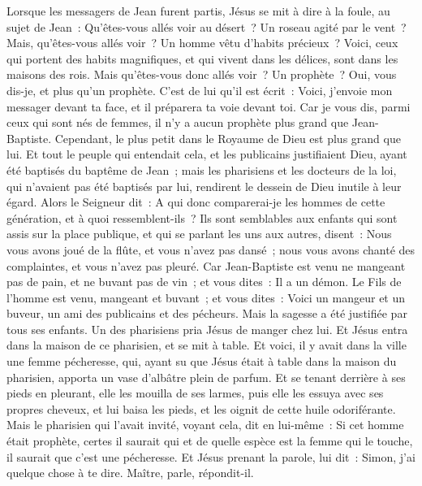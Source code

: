 \begin{multicols}{2}
Lorsque les messagers de Jean furent partis, Jésus se mit à dire à la foule, au sujet de Jean~: Qu'êtes-vous allés voir au désert~? Un roseau agité par le vent~?
Mais, qu'êtes-vous allés voir~? Un homme vêtu d'habits précieux~? Voici, ceux qui portent des habits magnifiques, et qui vivent dans les délices, sont dans les maisons des rois.
Mais qu'êtes-vous donc allés voir~? Un prophète~? Oui, vous dis-je, et plus qu'un prophète.
C'est de lui qu'il est écrit~: Voici, j'envoie mon messager devant ta face, et il préparera ta voie devant toi.
Car je vous dis, parmi ceux qui sont nés de femmes, il n'y a aucun prophète plus grand que Jean-Baptiste. Cependant, le plus petit dans le Royaume de Dieu est plus grand que lui.
Et tout le peuple qui entendait cela, et les publicains justifiaient Dieu, ayant été baptisés du baptême de Jean~;
mais les pharisiens et les docteurs de la loi, qui n'avaient pas été baptisés par lui, rendirent le dessein de Dieu inutile à leur égard.
Alors le Seigneur dit~: A qui donc comparerai-je les hommes de cette génération, et à quoi ressemblent-ils~?
Ils sont semblables aux enfants qui sont assis sur la place publique, et qui se parlant les uns aux autres, disent~: Nous vous avons joué de la flûte, et vous n'avez pas dansé~; nous vous avons chanté des complaintes, et vous n'avez pas pleuré.
Car Jean-Baptiste est venu ne mangeant pas de pain, et ne buvant pas de vin~; et vous dites~: Il a un démon.
Le Fils de l'homme est venu, mangeant et buvant~; et vous dites~: Voici un mangeur et un buveur, un ami des publicains et des pécheurs.
Mais la sagesse a été justifiée par tous ses enfants.
Un des pharisiens pria Jésus de manger chez lui. Et Jésus entra dans la maison de ce pharisien, et se mit à table.
Et voici, il y avait dans la ville une femme pécheresse, qui, ayant su que Jésus était à table dans la maison du pharisien, apporta un vase d'albâtre plein de parfum.
Et se tenant derrière à ses pieds en pleurant, elle les mouilla de ses larmes, puis elle les essuya avec ses propres cheveux, et lui baisa les pieds, et les oignit de cette huile odoriférante.
Mais le pharisien qui l'avait invité, voyant cela, dit en lui-même~: Si cet homme était prophète, certes il saurait qui et de quelle espèce est la femme qui le touche, il saurait que c'est une pécheresse.
Et Jésus prenant la parole, lui dit~: Simon, j'ai quelque chose à te dire. Maître, parle, répondit-il.

\end{multicols}
